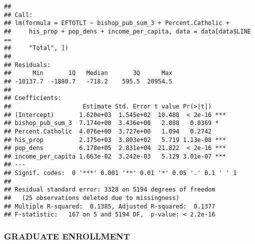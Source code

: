 \documentclass[]{article}
\newenvironment{Shaded}{\begin{snugshade}}{\end{snugshade}}
\newcommand{\KeywordTok}[1]{\textcolor[rgb]{0.13,0.29,0.53}{\textbf{#1}}}
\newcommand{\DataTypeTok}[1]{\textcolor[rgb]{0.13,0.29,0.53}{#1}}
\newcommand{\DecValTok}[1]{\textcolor[rgb]{0.00,0.00,0.81}{#1}}
\newcommand{\StringTok}[1]{\textcolor[rgb]{0.31,0.60,0.02}{#1}}
\newcommand{\OperatorTok}[1]{\textcolor[rgb]{0.81,0.36,0.00}{\textbf{#1}}}
\newcommand{\NormalTok}[1]{#1}
\begin{document}
\begin{verbatim}
## 
## Call:
## lm(formula = EFTOTLT ~ bishop_pub_sum_3 + Percent.Catholic + 
##     his_prop + pop_dens + income_per_capita, data = data[data$LINE == 
##     "Total", ])
## 
## Residuals:
##      Min       1Q   Median       3Q      Max 
## -10137.7  -1880.7   -718.2    595.5  20954.5 
## 
## Coefficients:
##                    Estimate Std. Error t value Pr(>|t|)    
## (Intercept)       1.620e+03  1.545e+02  10.488  < 2e-16 ***
## bishop_pub_sum_3  7.174e+00  3.436e+00   2.088   0.0369 *  
## Percent.Catholic  4.076e+00  3.727e+00   1.094   0.2742    
## his_prop          2.175e+03  3.803e+02   5.719 1.13e-08 ***
## pop_dens          6.178e+05  2.831e+04  21.822  < 2e-16 ***
## income_per_capita 1.663e-02  3.242e-03   5.129 3.01e-07 ***
## ---
## Signif. codes:  0 '***' 0.001 '**' 0.01 '*' 0.05 '.' 0.1 ' ' 1
## 
## Residual standard error: 3328 on 5194 degrees of freedom
##   (25 observations deleted due to missingness)
## Multiple R-squared:  0.1385, Adjusted R-squared:  0.1377 
## F-statistic:   167 on 5 and 5194 DF,  p-value: < 2.2e-16
\end{verbatim}

\subsubsection{GRADUATE ENROLLMENT}\label{graduate-enrollment}

\begin{Shaded}
\end{Shaded}
\end{document}
